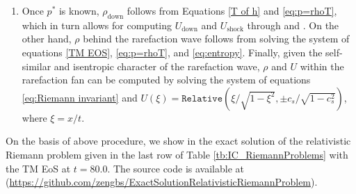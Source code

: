 \begin{enumerate}
    \item Once $p^{*}$ is known, $\rho_{\text{down}}$ follows from Equations \eqref{T of h} and \eqref{eq:p=rhoT}, which in turn allows for computing $U_{\text{down}}$ and $U_{\text{shock}}$ through  and . On the other hand, $\rho$ behind the rarefaction wave follows from solving the system of equations \eqref{TM EOS}, \eqref{eq:p=rhoT}, and \eqref{eq:entropy}. Finally, given the self-similar and isentropic character of the rarefaction wave, $\rho$ and $U$ within the rarefaction fan can be computed by solving the system of equations \eqref{eq:Riemann invariant} and $U(\xi)=\texttt{Relative}(\xi/\sqrt{1-\xi^2},\pm c_{s}/\sqrt{1-c_{s}^2})$, where $\xi=x/t$.
    \end{enumerate}

On the basis of above procedure, we show in  the exact solution of the relativistic Riemann problem given in the last row of Table \ref{tb:IC_RiemannProblems} with the TM EoS at $t=80.0$. The source code is available at\\
(\url{https://github.com/zengbs/ExactSolutionRelativisticRiemannProblem}).

